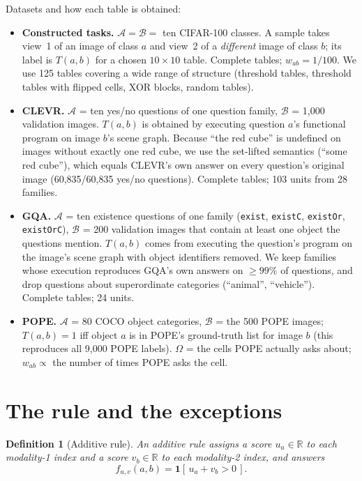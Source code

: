 \documentclass[11pt]{article}
\newtheorem{definition}{Definition}
\newcommand{\R}{\mathbb{R}}
\newcommand{\1}{\mathbf{1}}
\begin{document}
\noindent
Datasets and how each table is obtained:
\begin{itemize}[leftmargin=1.5em]
  \item \textbf{Constructed tasks.} $\mathcal{A}=\mathcal{B}=$ ten CIFAR-100 classes. A sample takes view~1 of an image
  of class $a$ and view~2 of a \emph{different} image of class $b$; its label is $T(a,b)$ for a chosen $10\times10$
  table. Complete tables; $w_{ab}=1/100$. We use 125 tables covering a wide range of structure (threshold tables,
  threshold tables with flipped cells, XOR blocks, random tables).
  \item \textbf{CLEVR.} $\mathcal{A}$ = ten yes/no questions of one question family, $\mathcal{B}$ = 1{,}000 validation
  images. $T(a,b)$ is obtained by executing question $a$'s functional program on image $b$'s scene graph. Because
  ``the red cube'' is undefined on images without exactly one red cube, we use the set-lifted semantics
  (``some red cube''), which equals CLEVR's own answer on every question's original image (60{,}835/60{,}835 yes/no
  questions). Complete tables; 103 units from 28 families.
  \item \textbf{GQA.} $\mathcal{A}$ = ten existence questions of one family (\texttt{exist}, \texttt{existC},
  \texttt{existOr}, \texttt{existOrC}), $\mathcal{B}$ = 200 validation images that contain at least one object the
  questions mention. $T(a,b)$ comes from executing the question's program on the image's scene graph with object
  identifiers removed. We keep families whose execution reproduces GQA's own answers on $\ge 99\%$ of questions, and
  drop questions about superordinate categories (``animal'', ``vehicle''). Complete tables; 24 units.
  \item \textbf{POPE.} $\mathcal{A}$ = 80 COCO object categories, $\mathcal{B}$ = the 500 POPE images; $T(a,b)=1$ iff
  object $a$ is in POPE's ground-truth list for image $b$ (this reproduces all 9{,}000 POPE labels). $\Omega$ = the
  cells POPE actually asks about; $w_{ab}\propto$ the number of times POPE asks the cell.
\end{itemize}

\section{The rule and the exceptions}\label{sec:rule}

\begin{definition}[Additive rule]
An \emph{additive rule} assigns a score $u_a\in\R$ to each modality-1 index and a score $v_b\in\R$ to each modality-2
index, and answers
\begin{equation}
  f_{u,v}(a,b)=\1\!\left[\,u_a+v_b>0\,\right].
\end{equation}
\end{definition}
\end{document}
